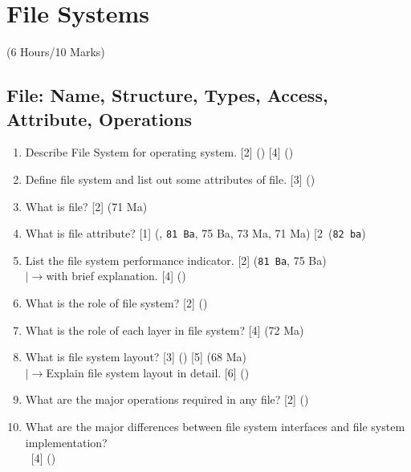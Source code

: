 \documentclass[12pt]{article}
\newcommand{\lb}{\\$\left|\rightarrow\right.$}
\newcommand{\enter}{\\\textcolor{white}{1}}
\begin{document}
	\pagebreak

\section{File Systems}
	\begin{center}(6 Hours/10 Marks)\end{center}
	\subsection{File: Name, Structure, Types, Access, Attribute, Operations}
		\begin{enumerate}[noitemsep, topsep=0pt]
			\item Describe File System for operating system. \hfill [2] () [4] ()

			\item Define file system and list out some attributes of file. \hfill [3] ()

			\item What is file? \hfill [2] (71 Ma)

			\item What is file attribute? \hfill [1] (, \texttt{81 Ba}, 75 Ba, 73 Ma, 71 Ma) [2\ (\texttt{82 ba})

			\item List the file system performance indicator. \hfill [2] (\texttt{81 Ba}, 75 Ba)
			\lb with brief explanation. \hfill [4] ()

			\item What is the role of file system? \hfill [2] ()

			\item What is the role of each layer in file system? \hfill [4] (72 Ma)

			\item What is file system layout? \hfill [3] () [5] (68 Ma)
			\lb Explain file system layout in detail. \hfill [6] ()

			\item What are the major operations required in any file? \hfill [2] ()

			\item What are the major differences between file system interfaces and file system implementation?
			\enter\hfill [4] ()
		\end{enumerate}
\end{document}
